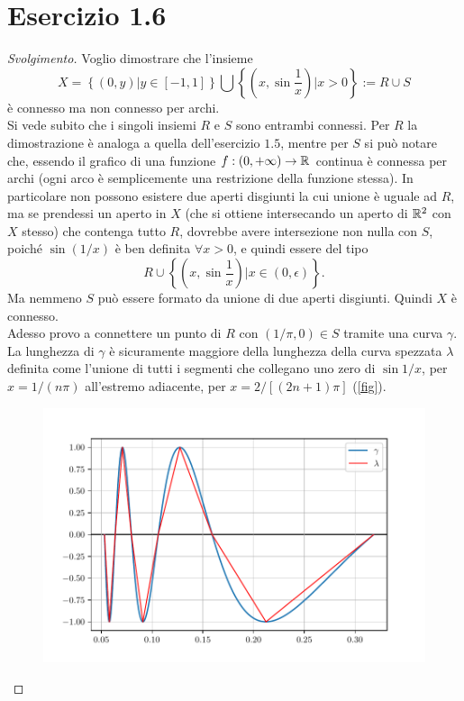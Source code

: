\documentclass[italian,a4paper,11pt]{article}
\begin{document}
\section*{Esercizio 1.6}
\begin{proof}[Svolgimento]
Voglio dimostrare che l'insieme $$ X = \left\{(0,y) | y \in [-1,1]\right\} \bigcup \left\{\left(x,\sin{\frac1x}\right)|x>0\right\} := R\cup S $$ è connesso ma non connesso per archi.\\
Si vede subito che i singoli insiemi $R$ e $S$ sono entrambi connessi. Per $R$ la dimostrazione è analoga a quella dell'esercizio $1.5$, mentre per $S$ si può notare che, essendo il grafico di una funzione $f:(0,+\infty)\rightarrow \mathbb R$ continua è connessa per archi (ogni arco è semplicemente una restrizione della funzione stessa). 
In particolare non possono esistere due aperti disgiunti la cui unione è uguale ad $R$, ma se prendessi un aperto in $X$ (che si ottiene intersecando un aperto di $\mathbb R^2$ con $X$ stesso) che contenga tutto $R$, dovrebbe avere intersezione non nulla con $S$, poiché $\sin{(1/x)}$ è ben definita $\forall x>0$, e quindi essere del tipo $$R\cup  \left\{\left(x,\sin{\frac1x}\right)|x \in (0,\epsilon)\right\}.$$
Ma nemmeno $S$ può essere formato da unione di due aperti disgiunti.
Quindi $X$ è connesso.\\
Adesso provo a connettere un punto di $R$ con $(1/\pi ,0) \in S$ tramite una curva $\gamma$. 
La lunghezza di $\gamma$ è sicuramente maggiore della lunghezza della curva spezzata $\lambda$ definita come l'unione di tutti i segmenti che collegano uno zero di $\sin{1/x}$, per $x=1/(n\pi)$ all'estremo adiacente, per $x=2/[(2n+1)\pi]$ (\cref{fig}).
\begin{figure}[!htb]
\centering
\includegraphics[scale=0.8]{../img/sin1x.pdf}

\end{figure}
\end{proof}
\end{document}
